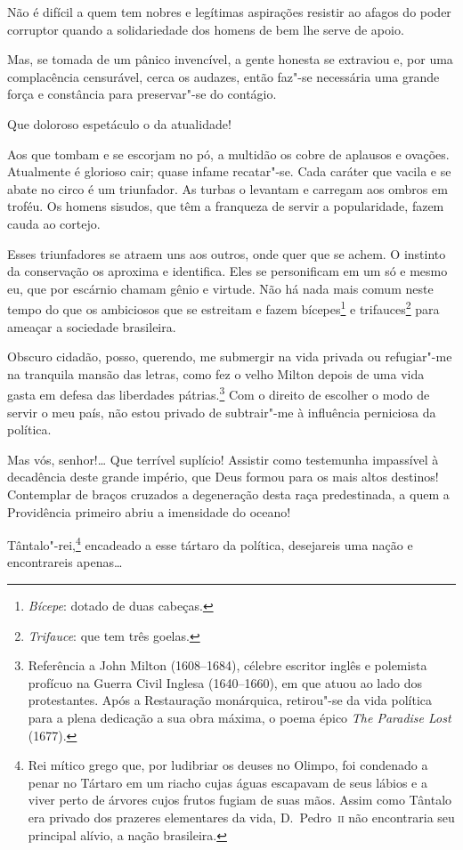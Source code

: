  Não é difícil a quem tem nobres e legítimas aspirações resistir ao
afagos do poder corruptor quando a solidariedade dos homens de bem lhe
serve de apoio. 

 Mas, se tomada de um pânico invencível, a gente honesta se extraviou e,
por uma complacência censurável, cerca os audazes, então faz"-se
necessária uma grande força e constância para preservar"-se do contágio. 

 Que doloroso espetáculo o da atualidade!

 Aos que tombam e se escorjam no pó, a multidão os cobre de aplausos e
ovações. Atualmente é glorioso cair; quase infame recatar"-se. Cada
caráter que vacila e se abate no circo é um triunfador. As turbas o
levantam e carregam aos ombros em troféu. Os homens sisudos, que têm a
franqueza de servir a popularidade, fazem cauda ao cortejo. 

 Esses triunfadores se atraem uns aos outros, onde quer que se achem. O
instinto da conservação os aproxima e identifica. Eles se personificam
em um só e mesmo eu, que por escárnio chamam gênio e virtude. Não há
nada mais comum neste tempo do que os ambiciosos que se estreitam e
fazem bícepes\footnote{ \textit{Bícepe}: dotado de duas cabeças.}
 e trifauces\footnote{ \textit{Trifauce}: que tem três goelas.}
 para ameaçar a sociedade brasileira. 

 Obscuro cidadão, posso, querendo, me submergir na vida privada ou
refugiar"-me na tranquila mansão das letras, como fez o velho Milton
depois de uma vida gasta em defesa das liberdades
pátrias.\footnote{ Referência a John Milton (1608--1684), célebre escritor inglês e
polemista profícuo na Guerra Civil Inglesa (1640--1660), em que atuou
ao lado dos protestantes. Após a Restauração monárquica, retirou"-se
da vida política para a plena dedicação a sua obra máxima, o poema
épico \textit{The Paradise Lost} (1677).}
 Com o direito de escolher o modo de servir o meu país, não estou
privado de subtrair"-me à influência perniciosa da política.

 Mas vós, senhor!\ldots{} Que terrível suplício! Assistir como testemunha
impassível à decadência deste grande império, que Deus formou para os
mais altos destinos! Contemplar de braços cruzados a degeneração desta
raça predestinada, a quem a Providência primeiro abriu a imensidade do oceano!

 Tântalo"-rei,\footnote{ Rei mítico grego que, por ludibriar os deuses no Olimpo, foi condenado
a penar no Tártaro em um riacho cujas águas escapavam de seus lábios e
a viver perto de árvores cujos frutos fugiam de suas mãos. Assim como
Tântalo era privado dos prazeres elementares da vida, D.~Pedro~\textsc{ii} não
encontraria seu principal alívio, a nação brasileira.}
 encadeado a esse tártaro da política, desejareis uma nação e
encontrareis apenas\ldots{}

